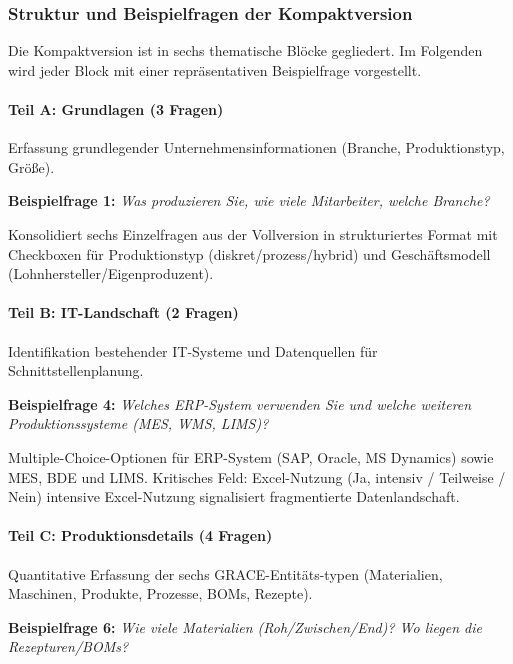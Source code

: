 \subsubsection{Struktur und Beispielfragen der Kompaktversion}

Die Kompaktversion ist in sechs thematische Blöcke gegliedert. Im Folgenden wird jeder Block mit einer repräsentativen Beispielfrage vorgestellt.

\paragraph{Teil A: Grundlagen (3 Fragen)}

Erfassung grundlegender Unternehmensinformationen (Branche, Produktionstyp, Größe).

\textbf{Beispielfrage 1:} \textit{\glqq Was produzieren Sie, wie viele Mitarbeiter, welche Branche?\grqq{}}

\noindent Konsolidiert sechs Einzelfragen aus der Vollversion in strukturiertes Format mit Checkboxen für Produktionstyp (diskret/prozess/hybrid) und Geschäftsmodell (Lohnhersteller/Eigenproduzent).

\paragraph{Teil B: IT-Landschaft (2 Fragen)}

Identifikation bestehender IT-Systeme und Datenquellen für Schnittstellenplanung.

\textbf{Beispielfrage 4:} \textit{\glqq Welches ERP-System verwenden Sie und welche weiteren Produktionssysteme (MES, WMS, LIMS)?\grqq{}}

\noindent Multiple-Choice-Optionen für ERP-System (SAP, Oracle, MS Dynamics) sowie MES, BDE und LIMS. Kritisches Feld: \glqq Excel-Nutzung\grqq{} (Ja, intensiv / Teilweise / Nein) intensive Excel-Nutzung signalisiert fragmentierte Datenlandschaft.

\paragraph{Teil C: Produktionsdetails (4 Fragen)}

Quantitative Erfassung der sechs GRACE-Entitäts-typen (Materialien, Maschinen, Produkte, Prozesse, BOMs, Rezepte).

\textbf{Beispielfrage 6:} \textit{\glqq Wie viele Materialien (Roh/Zwischen/End)? Wo liegen die Rezepturen/BOMs?\grqq{}}


